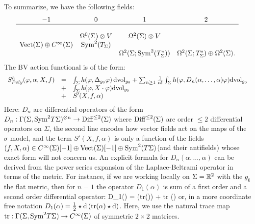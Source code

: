 To summarize, we have the following fields:
\[
\begin{array}{cccc}
-1 &0 & 1 & 2\\
\hline \\
& \Omega^{0}(\Sigma) \otimes V & \Omega^2(\Sigma) \otimes V & \\
{\rm Vect}(\Sigma) \oplus C^\infty(\Sigma) & {\rm Sym}^2(T_\Sigma) & & \\
& & \Omega^2(\Sigma ; {\rm Sym}^{2}(T^*_\Sigma)) & \Omega^2(\Sigma ; T^*_\Sigma) \oplus \Omega^2(\Sigma) .
\end{array}
\]
The BV action functional is of the form:
\begin{equation}\label{polyakov bv}
\begin{array}{lll}
S^{h}_{Poly}(\varphi,\alpha,X,f) & = & \int_\Sigma h(\varphi, \Delta_{g_0} \varphi)\, {\rm dvol}_{g_0} + \sum_{n \geq 1} \frac{1}{n!} \int_{\Sigma} h(\varphi, D_n(\alpha,\ldots,\alpha) \varphi) {\rm dvol}_{g_0} \\
& + & \int_{\Sigma} h(\varphi, X \cdot \varphi) {\rm dvol}_{g_0} \\
& + & S'(X, f, \alpha) 
\end{array}
\end{equation}
Here: $D_n$ are differential operators of the form $D_n : \Gamma(\Sigma , {\rm Sym}^2 T\Sigma)^{\otimes n} \to {\rm Diff}^{\leq 2} (\Sigma)$ where ${\rm Diff}^{\leq 2}(\Sigma)$ are order $\leq 2$ differential operators on $\Sigma$, the second line encodes how vector fields act on the maps of the $\sigma$ model, and the term $S'(X, f, \alpha)$ is only a function of the fields $(f, X, \alpha) \in C^\infty(\Sigma)[-1] \oplus {\rm Vect}(\Sigma)[-1] \oplus {\rm Sym}^2(T\Sigma)$(and their antifields) whose exact form will not concern us. 
An explicit formula for $D_n(\alpha,\ldots,\alpha)$ can be derived from the power series expansion of the Laplace-Beltrami operator in terms of the metric. 
For instance, if we are working locally on $\Sigma = \mathbb R^2$ with the $g_0$ the flat metric, then for $n=1$ the operator $D_1(\alpha)$ is sum of a first order and a second order differential operator:
\ben
D_1(\alpha) =   ({\rm tr}(\alpha))  +  {\rm tr} (\alpha)   
\een
or, in a more coordinate free notation $D_1(\alpha) = \frac{1}{2} \star {\rm d} \left({\rm tr}(\alpha) \star {\rm d}\right)$. 
Here, we use the natural trace map ${\rm tr} : \Gamma(\Sigma , {\rm Sym}^2 T\Sigma) \to C^\infty(\Sigma)$ of symmetric $2\times2$ matrices. 

